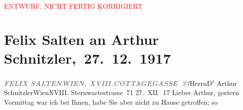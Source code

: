 
\begin{center}
            \textcolor{red}{ENTWURF, NICHT FERTIG KORRIGIERT}
                      \end{center}
            
         
         \renewcommand{\erwaehntePersonen}{Personen: Ottilie Salten}
         \renewcommand{\erwaehnteInstitutionen}{Institutionen: Volkstheater}
         \renewcommand{\erwaehnteOrte}{Orte: Cottagegasse, Sternwartestraße 71, Wien, XVIII., Währing}
         \renewcommand{\erwaehnteWerke}{Werke: Kinder der Freude. Drei Einakter}
               \section[ Felix Salten an Arthur Schnitzler, 27. 12. 1917]{ Felix Salten an Arthur Schnitzler, 27. 12. 1917}\nopagebreak{}\rehead{ }\begin{ledgroupsized}[t]{13cm}\normalsize\beginnumbering \toendnotes[C]{\smallbreak\pagebreak[2]} 
\toendnotes[C]{\smallbreak}\pstart{}{\pb}\textcolor{gray}{\textbf{\textit{FELIX SALTEN}}}\pend{}\pstart{}\textcolor{gray}{\textbf{\textit{WIEN, XVIII.}}}\pend{}\pstart{}\textcolor{gray}{\textbf{\textit{COTTAGEGASSE 37}}}\pend{}{\bigskip}\pstart{}Herrn\pend{}\pstart{}D\textsuperscript{r} Arthur Schnitzler\pend{}\pstart{}Wien\pend{}\pstart{}XVIII. Sternwartestrasse 71\pend{}{\bigskip}\pstart
           \raggedleft{}{\pb}27. XII. 17\pend
           \pstart{}Lieber Arthur,\pend\pstart
           gestern{ }Vormittag war ich bei Ihnen, habe Sie aber nicht zu Hause getroffen; so

\end{ledgroupsized}
